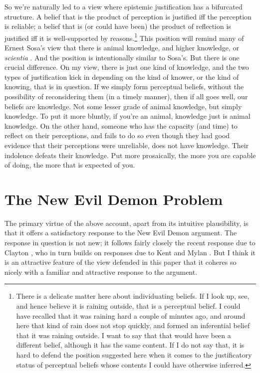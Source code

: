 So we're naturally led to a view where epistemic justification has a bifurcated structure. A belief that is the product of perception is justified iff the perception is reliable; a belief that is (or could have been) the product of reflection is justified iff it is well-supported by reasons.\footnote{There is a delicate matter here about individuating beliefs. If I look up, see, and hence believe it is raining outside, that is a perceptual belief. I could have recalled that it was raining hard a couple of minutes ago, and around here that kind of rain does not stop quickly, and formed an inferential belief that it was raining outside. I want to say that that would have been a different belief, although it has the same content. If I do not say that, it is hard to defend the position suggested here when it comes to the justificatory status of perceptual beliefs whose contents I could have otherwise inferred.} This position will remind many of Ernest Sosa's view that there is animal knowledge, and higher knowledge, or \textit{scientia} \citep{Sosa1991, Sosa1997}. And the position is intentionally similar to Sosa's. But there is one crucial difference. On my view, there is just one kind of knowledge, and the two types of justification kick in depending on the kind of knower, or the kind of knowing, that is in question. If we simply form perceptual beliefs, without the possibility of reconsidering them (in a timely manner), then if all goes well, our beliefs are knowledge. Not some lesser grade of animal knowledge, but simply knowledge. To put it more bluntly, if you're an animal, knowledge just is animal knowledge. On the other hand, someone who has the capacity (and time) to reflect on their perceptions, and fails to do so even though they had good evidence that their perceptions were unreliable, does not have knowledge. Their indolence defeats their knowledge. Put more prosaically, the more you are capable of doing, the more that is expected of you.


\section{The New Evil Demon Problem} 

The primary virtue of the above account, apart from its intuitive plausibility, is that it offers a satisfactory response to the New Evil Demon argument. The response in question is not new; it follows fairly closely the recent response due to Clayton \citet{Littlejohn2009}, who in turn builds on responses due to Kent \citet{Bach1985} and Mylan \citet{Engel1992}.  But I think it is an attractive feature of the view defended in this paper that it coheres so nicely with a familiar and attractive response to the argument.

